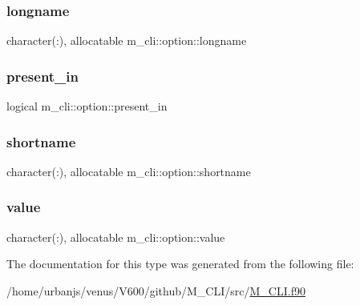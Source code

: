 \subsubsection{\texorpdfstring{longname}{longname}}
{\footnotesize\ttfamily character(\+:), allocatable m\+\_\+cli\+::option\+::longname\hspace{0.3cm}{\ttfamily [private]}}

\mbox{\label{structm__cli_1_1option_a03434888018f675f2680f5defdc4b739}} 
\subsubsection{\texorpdfstring{present\+\_\+in}{present\_in}}
{\footnotesize\ttfamily logical m\+\_\+cli\+::option\+::present\+\_\+in\hspace{0.3cm}{\ttfamily [private]}}

\mbox{\label{structm__cli_1_1option_aa692838478185b97d4cfd1466f50bbd2}} 
\subsubsection{\texorpdfstring{shortname}{shortname}}
{\footnotesize\ttfamily character(\+:), allocatable m\+\_\+cli\+::option\+::shortname\hspace{0.3cm}{\ttfamily [private]}}

\mbox{\label{structm__cli_1_1option_af205e1577880efcf61a60b96b27adfcb}} 
\subsubsection{\texorpdfstring{value}{value}}
{\footnotesize\ttfamily character(\+:), allocatable m\+\_\+cli\+::option\+::value\hspace{0.3cm}{\ttfamily [private]}}



The documentation for this type was generated from the following file\+:\begin{DoxyCompactItemize}
\item 
/home/urbanjs/venus/\+V600/github/\+M\+\_\+\+C\+L\+I/src/\mbox{\hyperlink{M__CLI_8f90}{M\+\_\+\+C\+L\+I.\+f90}}\end{DoxyCompactItemize}
